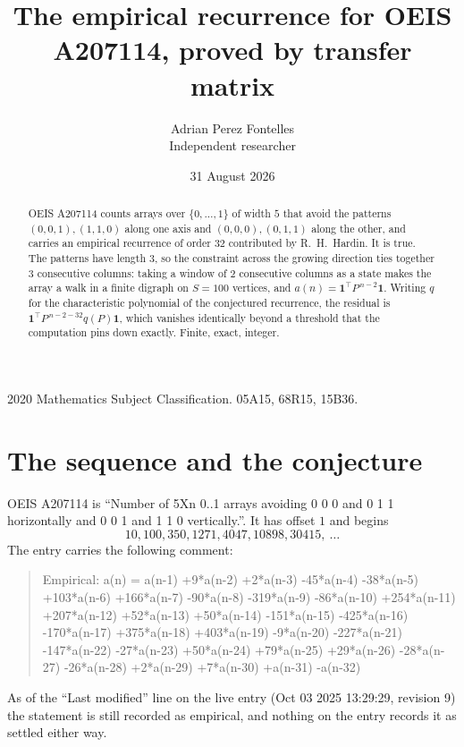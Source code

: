 \documentclass[11pt,a4paper]{article}
\title{The empirical recurrence for OEIS A207114, proved by transfer matrix}
\author{Adrian Perez Fontelles\\ \small Independent researcher}
\date{31 August 2026}
\theoremstyle{plain}
\theoremstyle{definition}
\begin{document}
\maketitle

\begin{abstract}
OEIS A207114 counts arrays over $\{0,\dots,1\}$ of width $5$ that avoid the patterns
$(0,0,1), (1,1,0)$ along one axis and $(0,0,0), (0,1,1)$ along the other, and carries an empirical recurrence of
order $32$ contributed by R.~H.~Hardin. It is true. The patterns have length $3$, so
the constraint across the growing direction ties together $3$ consecutive columns: taking a
window of $2$ consecutive columns as a state makes the array a walk in a finite digraph
on $S=100$ vertices, and $a(n)=\mathbf{1}^{\!\top}P^{\,n-2}\mathbf{1}$. Writing $q$
for the characteristic polynomial of the conjectured recurrence, the residual is
$\mathbf{1}^{\!\top}P^{\,n-2-32}q(P)\mathbf{1}$, which vanishes identically
beyond a threshold that the computation pins down exactly. Finite, exact, integer.
\end{abstract}

\noindent\small 2020 Mathematics Subject Classification. 05A15, 68R15, 15B36.\normalsize

\section{The sequence and the conjecture}

OEIS A207114 is ``Number of 5Xn 0..1 arrays avoiding 0 0 0 and 0 1 1 horizontally and 0 0 1 and 1 1 0 vertically.''. It has offset
$1$ and begins
\[
10, 100, 350, 1271, 4047, 10898, 30415,\ \dots
\]
The entry carries the following comment:
\begin{quote}\small
Empirical: a(n) = a(n-1) +9*a(n-2) +2*a(n-3) -45*a(n-4) -38*a(n-5) +103*a(n-6) +166*a(n-7) -90*a(n-8) -319*a(n-9) -86*a(n-10) +254*a(n-11) +207*a(n-12) +52*a(n-13) +50*a(n-14) -151*a(n-15) -425*a(n-16) -170*a(n-17) +375*a(n-18) +403*a(n-19) -9*a(n-20) -227*a(n-21) -147*a(n-22) -27*a(n-23) +50*a(n-24) +79*a(n-25) +29*a(n-26) -28*a(n-27) -26*a(n-28) +2*a(n-29) +7*a(n-30) +a(n-31) -a(n-32)
\end{quote}
As of the ``Last modified'' line on the live entry (Oct 03 2025 13:29:29, revision
9) the statement is still recorded as empirical, and nothing on the entry
records it as settled either way.
\end{document}
